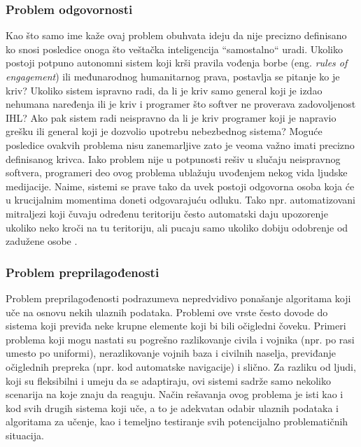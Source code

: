 \documentclass[a4paper]{article}
\begin{document}
\subsubsection{Problem odgovornosti}
\label{subsubsec: Problem odgovornosti}
Kao što samo ime kaže ovaj problem obuhvata ideju da nije precizno definisano ko snosi posledice onoga što veštačka inteligencija ``samostalno`` uradi. Ukoliko postoji potpuno autonomni sistem koji krši pravila vođenja borbe (eng. \emph{rules of engagement}) ili međunarodnog humanitarnog prava, postavlja se pitanje ko je kriv? Ukoliko sistem ispravno radi, da li je kriv samo general koji je izdao nehumana naređenja ili je kriv i programer što softver ne proverava zadovoljenost IHL? Ako pak sistem radi neispravno da li je kriv programer koji je napravio grešku ili general koji je dozvolio upotrebu nebezbednog sistema? Moguće posledice ovakvih problema nisu zanemarljive zato je veoma važno imati precizno definisanog krivca.
Iako problem nije u potpunosti rešiv u slučaju neispravnog softvera, programeri deo ovog problema ublažuju uvođenjem nekog vida ljudske medijacije. Naime, sistemi se prave tako da uvek postoji odgovorna osoba koja će u krucijalnim momentima doneti odgovarajuću odluku. Tako npr. automatizovani mitraljezi koji čuvaju određenu teritoriju često automatski daju upozorenje ukoliko neko kroči na tu teritoriju, ali pucaju samo ukoliko dobiju odobrenje od zadužene osobe \cite{killer_robots}. 
\subsubsection{Problem preprilagođenosti}
\label{subsubsec: Problem preprilagođenosti}
Problem preprilagođenosti podrazumeva nepredvidivo ponašanje algoritama koji uče na osnovu nekih ulaznih podataka. Problemi ove vrste često dovode do sistema koji previđa neke krupne elemente koji bi bili očigledni čoveku. Primeri problema koji mogu nastati su pogrešno razlikovanje civila i vojnika (npr. po rasi umesto po uniformi), nerazlikovanje vojnih baza i civilnih naselja, previđanje očiglednih prepreka (npr. kod automatske navigacije) i slično.
Za razliku od ljudi, koji su fleksibilni i umeju da se adaptiraju, ovi sistemi sadrže samo nekoliko scenarija na koje znaju da reaguju. Način rešavanja ovog problema je isti kao i kod svih drugih sistema koji uče, a to je adekvatan odabir ulaznih podataka i algoritama za učenje, kao i temeljno testiranje svih potencijalno problematičnih situacija.
\end{document}

